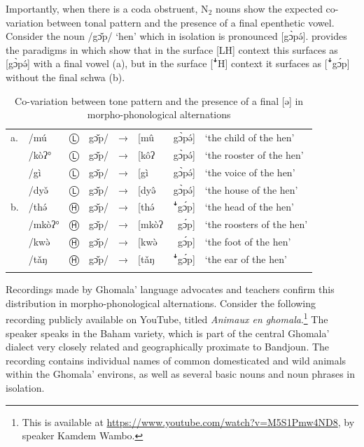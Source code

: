 \documentclass[output=paper,colorlinks,citecolor=brown,draft,draftmode]{langscibook}
\begin{document}
\noindent Importantly, when there is a coda obstruent, N$_2$ nouns show the expected co-variation between tonal pattern and the presence of a final epenthetic vowel.
Consider the noun /gɔ̌p/ `hen' 
which in isolation is pronounced [gɔ̀pə́].
\citet[157--158, 250--252]{nissim1981} provides the paradigms  in  which show that in the surface [LH] context this surfaces as [gɔ̀pə́]
with a final vowel (a), but in the surface [ꜜH]  context it surfaces as
[ꜜgɔ́p]
without the final schwa (b).

\begin{table}
\caption{Co-variation between tone pattern and the presence of a final {[}ə{] in morpho-phonological alternations} \citep[157--158, 250--252]{nissim1981}
}
\label{tab:hen}
 \begin{tabularx}{\textwidth}{lXllllrl}
  \lsptoprule
a. & /mú &   Ⓛ   & gɔ̌p/ & → & {[}mû & gɔ̀pə́{]} & `the child of the hen' \\
 & /kòʔ° &   Ⓛ   & gɔ̌p/ & → & {[}kôʔ & gɔ̀pə́{]} & `the rooster of the hen' \\
 & /gì &   Ⓛ   & gɔ̌p/ & → & {[}gì & gɔ̀pə́{]} & `the voice of the hen' \\
 & /dyə̌ &   Ⓛ   & gɔ̌p/ & → & {[}dyə̂ & gɔ̀pə́{]} & `the house of the hen' \\
b. & /thə́ &  Ⓗ  & gɔ̌p/ & → & {[}thə́ & ꜜgɔ́p{]} & `the head of the hen' \\
 & /mkòʔ° &  Ⓗ  & gɔ̌p/ & → & {[}mkòʔ & gɔ́p{]} & `the roosters of the hen' \\
 & /kwə̀ & Ⓗ  & gɔ̌p/ & → & {[}kwə̀ & gɔ́p{]} & `the foot of the hen' \\
 & /tǎŋ &  Ⓗ  & gɔ̌p/ & → & {[}tǎŋ & ꜜgɔ́p{]} & `the ear of the hen' \\
 \lspbottomrule
 \end{tabularx}
\end{table}


Recordings made by Ghomala' language advocates and teachers confirm this distribution in morpho-phonological alternations. 
Consider the following recording  publicly available on YouTube, titled \textit{Animaux en ghomala}.\footnote{This is available at \url{https://www.youtube.com/watch?v=M5S1Pmw4ND8}, by speaker Kamdem Wambo.} 
The speaker speaks in the Baham variety, which is part of the central Ghomala' dialect very closely related and geographically proximate to Bandjoun.
The recording contains individual names of common domesticated and wild animals within the Ghomala' environs, as well as several basic nouns and noun phrases in isolation. 
\end{document}
